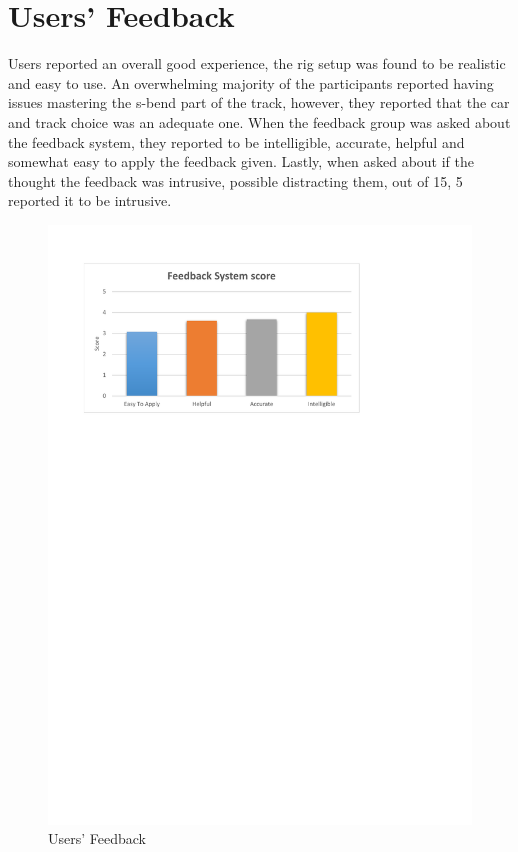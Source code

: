 \section{Users' Feedback}
\label{sec:eval-usersFeedback}

Users reported an overall good experience, the rig setup was found to be realistic and easy to use. An overwhelming majority of the participants reported having issues mastering the s-bend part of the track, however, they reported that the car and track choice was an adequate one. When the feedback group was asked about the feedback system, they reported to be intelligible, accurate, helpful and somewhat easy to apply the feedback given. Lastly, when asked about if the thought the feedback was intrusive, possible distracting them, out of 15, 5 reported it to be intrusive.

\begin{figure}[!htb]
	\centering
	\includegraphics[width=\textwidth]{charts/feedbacksystemfeedback.pdf}
	\caption[feedback system feedback]{Users' Feedback}
	\label{fig:chart-feedbacksystemfeedback}
\end{figure}

